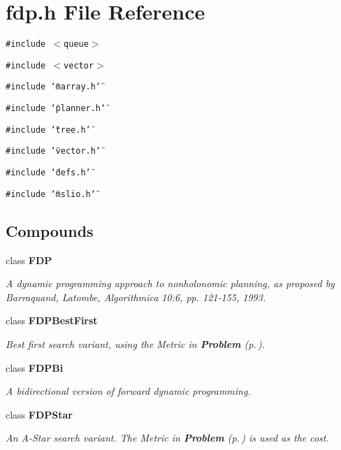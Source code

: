 \section{fdp.h File Reference}
\label{fdp_8h}
{\tt \#include $<$queue$>$}\par
{\tt \#include $<$vector$>$}\par
{\tt \#include \char`\"{}marray.h\char`\"{}}\par
{\tt \#include \char`\"{}planner.h\char`\"{}}\par
{\tt \#include \char`\"{}tree.h\char`\"{}}\par
{\tt \#include \char`\"{}vector.h\char`\"{}}\par
{\tt \#include \char`\"{}defs.h\char`\"{}}\par
{\tt \#include \char`\"{}mslio.h\char`\"{}}\par
\subsection*{Compounds}
\begin{CompactItemize}
\item 
class {\bf FDP}
\begin{CompactList}\small\item\em A dynamic programming approach to nonholonomic planning, as proposed by Barraquand, Latombe, Algorithmica 10:6, pp. 121-155, 1993.\item\end{CompactList}\item 
class {\bf FDPBest\-First}
\begin{CompactList}\small\item\em Best first search variant, using the Metric in {\bf Problem} {\rm (p.\,\pageref{classProblem})}.\item\end{CompactList}\item 
class {\bf FDPBi}
\begin{CompactList}\small\item\em A bidirectional version of forward dynamic programming.\item\end{CompactList}\item 
class {\bf FDPStar}
\begin{CompactList}\small\item\em An A-Star search variant. The Metric in {\bf Problem} {\rm (p.\,\pageref{classProblem})} is used as the cost.\item\end{CompactList}\end{CompactItemize}
